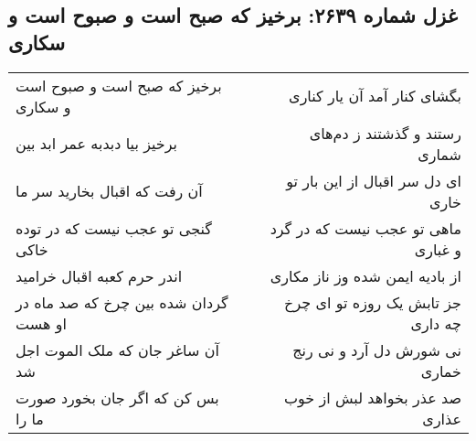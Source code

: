 \begin{center}
\section*{غزل شماره ۲۶۳۹: برخیز که صبح است و صبوح است و سکاری}
\label{sec:2639}
\begin{longtable}{l p{0.5cm} r}
برخیز که صبح است و صبوح است و سکاری
&&
بگشای کنار آمد آن یار کناری
\\
برخیز بیا دبدبه عمر ابد بین
&&
رستند و گذشتند ز دم‌های شماری
\\
آن رفت که اقبال بخارید سر ما
&&
ای دل سر اقبال از این بار تو خاری
\\
گنجی تو عجب نیست که در توده خاکی
&&
ماهی تو عجب نیست که در گرد و غباری
\\
اندر حرم کعبه اقبال خرامید
&&
از بادیه ایمن شده وز ناز مکاری
\\
گردان شده بین چرخ که صد ماه در او هست
&&
جز تابش یک روزه تو ای چرخ چه داری
\\
آن ساغر جان که ملک الموت اجل شد
&&
نی شورش دل آرد و نی رنج خماری
\\
بس کن که اگر جان بخورد صورت ما را
&&
صد عذر بخواهد لبش از خوب عذاری
\\
\end{longtable}
\end{center}
